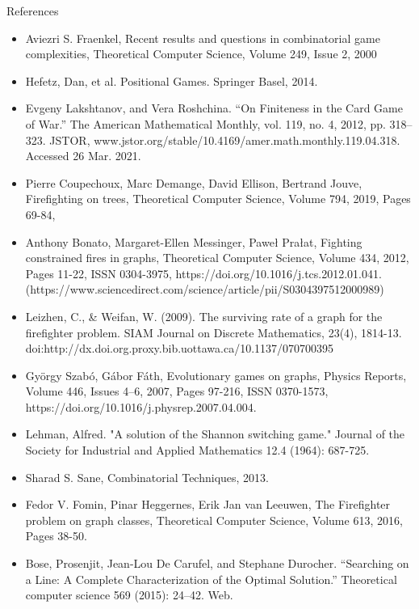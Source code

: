 \documentclass[compress]{beamer}
\begin{document}
\begin{frame}{References}
\begin{itemize}

\item Aviezri S. Fraenkel,
Recent results and questions in combinatorial game complexities,
Theoretical Computer Science,
Volume 249, Issue 2,
2000

\item Hefetz, Dan, et al. Positional Games. Springer Basel, 2014.


\item Evgeny Lakshtanov, and Vera Roshchina. “On Finiteness in the Card Game of War.” The American Mathematical Monthly, vol. 119, no. 4, 2012, pp. 318–323. JSTOR, www.jstor.org/stable/10.4169/amer.math.monthly.119.04.318. Accessed 26 Mar. 2021.

\item Pierre Coupechoux, Marc Demange, David Ellison, Bertrand Jouve,
Firefighting on trees,
Theoretical Computer Science,
Volume 794,
2019,
Pages 69-84,

\item Anthony Bonato, Margaret-Ellen Messinger, Paweł Prałat,
Fighting constrained fires in graphs,
Theoretical Computer Science,
Volume 434,
2012,
Pages 11-22,
ISSN 0304-3975,
https://doi.org/10.1016/j.tcs.2012.01.041.
(https://www.sciencedirect.com/science/article/pii/S0304397512000989)

\item Leizhen, C., \& Weifan, W. (2009). The surviving rate of a graph for the firefighter problem. SIAM Journal on Discrete Mathematics, 23(4), 1814-13. doi:http://dx.doi.org.proxy.bib.uottawa.ca/10.1137/070700395

\item György Szabó, Gábor Fáth,
Evolutionary games on graphs,
Physics Reports,
Volume 446, Issues 4–6,
2007,
Pages 97-216,
ISSN 0370-1573,
https://doi.org/10.1016/j.physrep.2007.04.004.

\item Lehman, Alfred. "A solution of the Shannon switching game." Journal of the Society for Industrial and Applied Mathematics 12.4 (1964): 687-725.

\item Sharad S. Sane, Combinatorial Techniques, 2013.

\item Fedor V. Fomin, Pinar Heggernes, Erik Jan van Leeuwen,
The Firefighter problem on graph classes,
Theoretical Computer Science,
Volume 613,
2016,
Pages 38-50.

\item Bose, Prosenjit, Jean-Lou De Carufel, and Stephane Durocher. “Searching on a Line: A Complete Characterization of the Optimal Solution.” Theoretical computer science 569 (2015): 24–42. Web.
\end{itemize}
\end{frame}
\end{document}
